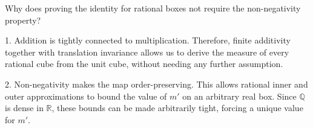\begin{note}
Why does proving the identity for rational boxes not require the non-negativity property?

1. Addition is tightly connected to multiplication. Therefore, finite additivity together with translation invariance allows us to derive the measure of every rational cube from the unit cube, without needing any further assumption.

2. Non-negativity makes the map order-preserving. This allows rational inner and outer approximations to bound the value of \(m'\) on an arbitrary real box. Since \(\mathbb Q\) is dense in \(\mathbb R\), these bounds can be made arbitrarily tight, forcing a unique value for \(m'\).
\end{note}